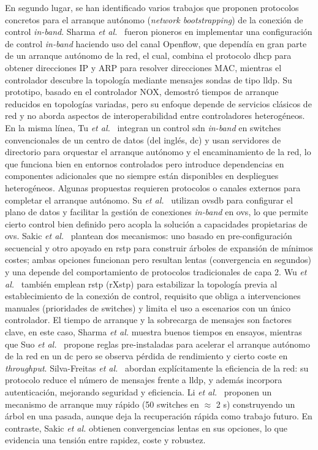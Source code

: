 En segundo lugar, se han identificado varios trabajos que proponen protocolos concretos para el arranque autónomo (\textit{network bootstrapping}) de la conexión de control \textit{in-band}. Sharma \textit{et al.}~\cite{Sharma13} fueron pioneros en implementar una configuración de control \textit{in-band} haciendo uso del canal Openflow, que dependía en gran parte de un arranque autónomo de la red, el cual, combina el protocolo \gls{dhcp} para obtener direcciones IP y ARP para resolver direcciones MAC, mientras el controlador descubre la topología mediante mensajes sondas de tipo \gls{lldp}. Su prototipo, basado en el controlador NOX, demostró tiempos de arranque reducidos en topologías variadas, pero su enfoque depende de servicios clásicos de red y no aborda aspectos de interoperabilidad entre controladores heterogéneos. En la misma línea, Tu \textit{et al.}~\cite{Tu14} integran un control \gls{sdn} \textit{in-band} en switches convencionales de un centro de datos (del inglés, \gls{dc}) y usan servidores de directorio para orquestar el arranque autónomo y el encaminamiento de la red, lo que funciona bien en entornos controlados pero introduce dependencias en componentes adicionales que no siempre están disponibles en despliegues heterogéneos. Algunas propuestas requieren protocolos o canales externos para completar el arranque autónomo. Su \textit{et al.}~\cite{Su17} utilizan \gls{ovsdb} para configurar el plano de datos y facilitar la gestión de conexiones \textit{in-band} en \gls{ovs}, lo que permite cierto control bien definido pero acopla la solución a capacidades propietarias de \gls{ovs}. Sakic \textit{et al.}~\cite{Sakic20} plantean dos mecanismos: uno basado en pre-configuración secuencial y otro apoyado en \gls{rstp} para construir árboles de expansión de mínimos costes; ambas opciones funcionan pero resultan lentas (convergencia en segundos) y una depende del comportamiento de protocolos tradicionales de capa 2. Wu \textit{et al.}~\cite{Wu21} también emplean \gls{rstp} (rXstp) para estabilizar la topología previa al establecimiento de la conexión de control, requisito que obliga a intervenciones manuales (prioridades de switches) y limita el uso a escenarios con un único controlador. El tiempo de arranque y la sobrecarga de mensajes son factores clave, en este caso, Sharma \textit{et al.} muestra buenos tiempos en ensayos, mientras que Suo \textit{et al.}~\cite{Suo16} propone reglas pre-instaladas para acelerar el arranque autónomo de la red en un \gls{dc} pero se observa pérdida de rendimiento y cierto coste en \textit{throughput}. Silva-Freitas \textit{et al.}~\cite{Silva-Freitas20} abordan explícitamente la eficiencia de la red: su protocolo reduce el número de mensajes frente a \gls{lldp}, y además incorpora autenticación, mejorando seguridad y eficiencia. Li \textit{et al.}~\cite{Li21} proponen un mecanismo de arranque muy rápido (50 switches en $\approx$ 2 s) construyendo un árbol en una pasada, aunque deja la recuperación rápida como trabajo futuro. En contraste, Sakic \textit{et al.} obtienen convergencias lentas en sus opciones, lo que evidencia una tensión entre rapidez, coste y robustez.\\
